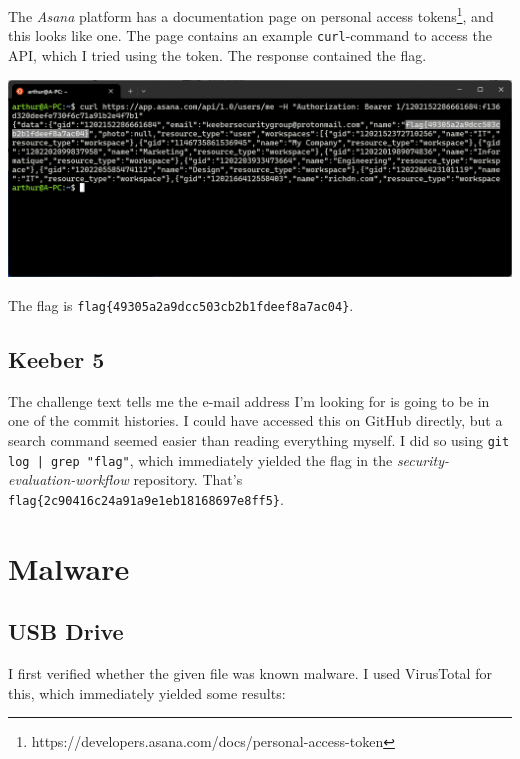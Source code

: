 \documentclass{article}
\begin{document}
\noindent The \textit{Asana} platform has a documentation page on personal access tokens\footnote{https://developers.asana.com/docs/personal-access-token}, and this looks like one. The page contains an example \texttt{curl}-command to access the API, which I tried using the token.  The response contained the flag.

\noindent 
\begin{center}
\includegraphics[width=16cm]{keeber3/screenshot2.png}
\end{center}
\noindent
The flag is \texttt{flag\{49305a2a9dcc503cb2b1fdeef8a7ac04\}}.

\subsection{Keeber 5}

The challenge text tells me the e-mail address I'm looking for is going to be in one of the commit histories. I could have accessed this on GitHub directly, but a search command seemed easier than reading everything myself. I did so using \texttt{git log | grep "flag"}, which immediately yielded the flag in the \textit{security-evaluation-workflow} repository. That's \texttt{flag\{2c90416c24a91a9e1eb18168697e8ff5\}}.

\section{Malware}
\subsection{USB Drive}

I first verified whether the given file was known malware. I used VirusTotal for this, which immediately yielded some results:
\end{document}
